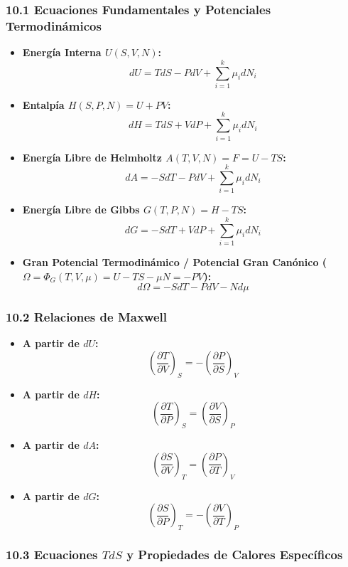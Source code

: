 \documentclass[11pt,a4paper]{article}
\begin{document}
\subsubsection*{10.1 Ecuaciones Fundamentales y Potenciales Termodinámicos}

\begin{itemize}
  \item \textbf{Energía Interna $U(S, V, N)$:}
  \[
    dU = T dS - P dV + \sum_{i=1}^k \mu_i dN_i
  \]
  \item \textbf{Entalpía $H(S, P, N) = U + PV$:}
  \[
    dH = T dS + V dP + \sum_{i=1}^k \mu_i dN_i
  \]
  \item \textbf{Energía Libre de Helmholtz $A(T, V, N) = F = U - TS$:}
  \[
    dA = -S dT - P dV + \sum_{i=1}^k \mu_i dN_i
  \]
  \item \textbf{Energía Libre de Gibbs $G(T, P, N) = H - TS$:}
  \[
    dG = -S dT + V dP + \sum_{i=1}^k \mu_i dN_i
  \]
  \item \textbf{Gran Potencial Termodinámico / Potencial Gran Canónico ($\Omega = \Phi_G(T, V, \mu) = U - TS - \mu N = -PV$):}
  \[
    d\Omega = -S dT - P dV - N d\mu
  \]
\end{itemize}

\subsubsection*{10.2 Relaciones de Maxwell}

\begin{itemize}
  \item \textbf{A partir de $dU$:}
  \[
    \left( \frac{\partial T}{\partial V} \right)_S = -\left( \frac{\partial P}{\partial S} \right)_V
  \]
  \item \textbf{A partir de $dH$:}
  \[
    \left( \frac{\partial T}{\partial P} \right)_S = \left( \frac{\partial V}{\partial S} \right)_P
  \]
  \item \textbf{A partir de $dA$:}
  \[
    \left( \frac{\partial S}{\partial V} \right)_T = \left( \frac{\partial P}{\partial T} \right)_V
  \]
  \item \textbf{A partir de $dG$:}
  \[
    \left( \frac{\partial S}{\partial P} \right)_T = -\left( \frac{\partial V}{\partial T} \right)_P
  \]
\end{itemize}

\subsubsection*{10.3 Ecuaciones $T dS$ y Propiedades de Calores Específicos}
\end{document}
